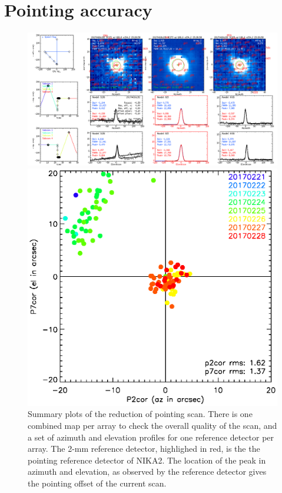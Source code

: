 \section{Pointing accuracy}
\label{se:pointing}

\begin{figure}[p]
\begin{center}
\includegraphics[clip, angle=0, scale = 0.30]{Figures/plot_20170418s192.png}
\caption{Summary plots of the reduction of pointing scan. There is one combined
  map per array to check the overall quality of the scan, and a set of azimuth
  and elevation profiles for one reference detector per array. The 2-mm reference
  detector, highlighed in red, is the the pointing reference detector of
  NIKA2. The location of the peak in azimuth and elevation, as observed by the
  reference detector gives the pointing offset of the current scan.}
\label{fig:ptg}
\end{center}
\begin{center}
\includegraphics[clip, angle=0, scale = 0.70]{Figures/pointing_stats_N2R9.eps}

\end{center}
\end{figure}
